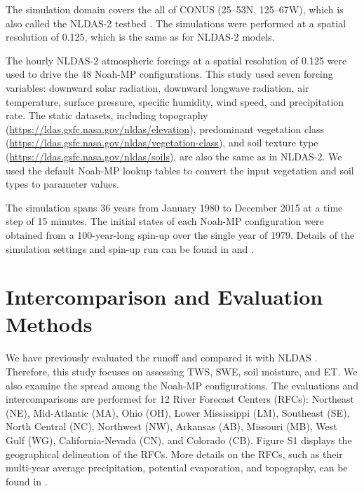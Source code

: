 \documentclass[essd, manuscript]{copernicus}
\begin{document}
The simulation domain covers the all of CONUS (25\degree{}--53\degree{}N, 125\degree{}--67\degree{}W), which is also called the NLDAS-2 testbed \citep{xia2012JGRA, xia2012JGRAa}. The simulations were performed at a spatial resolution of 0.125\degree{}, which is the same as for NLDAS-2 models.

The hourly NLDAS-2 atmospheric forcings at a spatial resolution of 0.125\degree{} were used to drive the 48 Noah-MP configurations. This study used seven forcing variables: downward solar radiation, downward longwave radiation, air temperature, surface pressure, specific humidity, wind speed, and precipitation rate. The static datasets, including topography (\url{https://ldas.gsfc.nasa.gov/nldas/elevation}), predominant vegetation class (\url{https://ldas.gsfc.nasa.gov/nldas/vegetation-class}), and soil texture type (\url{https://ldas.gsfc.nasa.gov/nldas/soils}), are also the same as in NLDAS-2. We used the default Noah-MP lookup tables to convert the input vegetation and soil types to parameter values.

The simulation spans 36 years from January 1980 to December 2015 at a time step of 15 minutes. The initial states of each Noah-MP configuration were obtained from a 100-year-long spin-up over the single year of 1979. Details of the simulation settings and spin-up run can be found in \citet[Section 2.3]{zheng2019WRR} and \citet[Section 2.2]{fei2021WRR}.

\section{Intercomparison and Evaluation Methods}\label{sec:methods}

We have previously evaluated the runoff and compared it with NLDAS \citep{fei2021WRR}. Therefore, this study focuses on assessing TWS, SWE, soil moisture, and ET\@. We also examine the spread among the Noah-MP configurations. The evaluations and intercomparisons are performed for 12 River Forecast Centers (RFCs): Northeast (NE), Mid-Atlantic (MA), Ohio (OH), Lower Mississippi (LM), Southeast (SE), North Central (NC), Northwest (NW), Arkansas (AB), Missouri (MB), West Gulf (WG), California-Nevada (CN), and Colorado (CB). Figure S1 displays the geographical delineation of the RFCs. More details on the RFCs, such as their multi-year average precipitation, potential evaporation, and topography, can be found in \citet[Figure 1]{fei2021WRR}.
\end{document}
